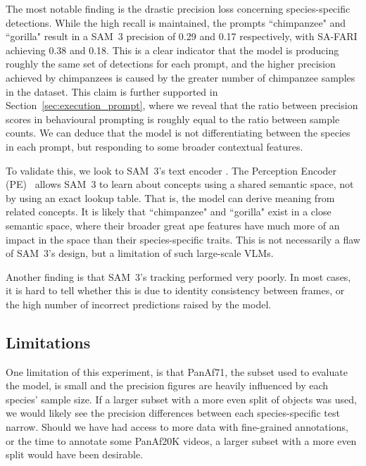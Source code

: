 \documentclass[author={Jacob Stephenson},
    degree={BSc},
    title={Robust Great Ape Species Detection in Wild Camera Trap Imagery with Promptable Concept Segmentation},
    unit={COMS30045},
    subtitle={}]{dissertation}
\begin{document}
The most notable finding is the drastic precision loss concerning species-specific detections. While the high recall is maintained, the prompts ``chimpanzee" and ``gorilla" result in a SAM~3 precision of 0.29 and 0.17 respectively, with SA-FARI achieving 0.38 and 0.18. This is a clear indicator that the model is producing roughly the same set of detections for each prompt, and the higher precision achieved by chimpanzees is caused by the greater number of chimpanzee samples in the dataset. This claim is further supported in Section~\ref{sec:execution_prompt}, where we reveal that the ratio between precision scores in behavioural prompting is roughly equal to the ratio between sample counts. We can deduce that the model is not differentiating between the species in each prompt, but responding to some broader contextual features.

To validate this, we look to SAM~3's text encoder \cite{carion2025sam3segmentconcepts}. The Perception Encoder (PE)~\cite{bolya2025perceptionencoderbestvisual} allows SAM~3 to learn about concepts using a shared semantic space, not by using an exact lookup table. That is, the model can derive meaning from related concepts. It is likely that ``chimpanzee" and ``gorilla" exist in a close semantic space, where their broader great ape features have much more of an impact in the space than their species-specific traits. This is not necessarily a flaw of SAM~3's design, but a limitation of such large-scale VLMs.

Another finding is that SAM~3's tracking performed very poorly. In most cases, it is hard to tell whether this is due to identity consistency between frames, or the high number of incorrect predictions raised by the model.

\subsection{Limitations}
\label{sec:evalsam3lim}

One limitation of this experiment, is that PanAf71, the subset used to evaluate the model, is small and the precision figures are heavily influenced by each species' sample size. If a larger subset with a more even split of objects was used, we would likely see the precision differences between each species-specific test narrow. Should we have had access to more data with fine-grained annotations, or the time to annotate some PanAf20K videos, a larger subset with a more even split would have been desirable.
\end{document}
